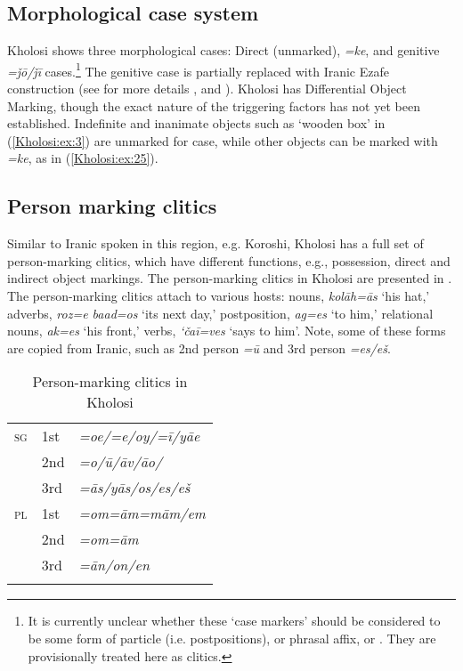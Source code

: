 \documentclass[output=paper,colorlinks,citecolor=brown]{langscibook}
\begin{document}
\subsection{Morphological case system}\label{Kholosi:ss:2.2}

Kholosi shows three morphological cases: Direct (unmarked),  \textit{=ke}, and genitive \textit{=ǰō/ǰī} cases.\footnote{ It is currently unclear whether these `case markers' should be considered to be some form of particle (i.e. postpositions), or phrasal affix, or . They are provisionally treated here as clitics.} The genitive case is partially replaced with Iranic Ezafe construction (see for more details \citealt{nourzaei_forthcoming_kholosi}, and \citealt{nourzaei_forthcoming_morphosyntax}). Kholosi has Differential Object Marking, though the exact nature of the triggering factors has not yet been established. Indefinite and inanimate objects such as `wooden box' in (\ref{Kholosi:ex:3}) are unmarked for case, while other objects can be marked with \textit{=ke}, as in (\ref{Kholosi:ex:25}).

\subsection{Person marking clitics}\label{Kholosi:ss:2.3}

\begin{sloppypar}
Similar to Iranic spoken in this region, e.g. Koroshi, Kholosi has a full set of person-marking clitics, which have different functions, e.g., possession, direct and indirect object markings. The person-marking clitics in Kholosi are presented in . The person-marking clitics attach to various hosts: nouns, \textit{kolāh=ās} `his hat,' adverbs, \textit{roz=e baad=os} `its next day,' postposition, \textit{ag=es} `to him,' relational nouns, \textit{ak=es} `his front,' verbs, \textit{ `čaī=ves} `says to him'. Note, some of these forms are copied from Iranic, such as 2nd person \textit{=ū} and 3rd person \textit{=es/eš}.
\end{sloppypar}

\begin{table}
 \centering
 \begin{tabular}{lll}
\lsptoprule
\textsc{sg} & 1st & \textit{=oe/=e/oy/=ī/yāe} \\
 & 2nd & \textit{=o/ū/āv/āo/} \\
 & 3rd & \textit{=ās/yās/os/es/eš} \\
\textsc{pl} & 1st & \textit{=om=ām=mām/em} \\
 & 2nd & \textit{=om=ām} \\
 & 3rd & \textit{=ān/on/en} \\
\lspbottomrule
 \end{tabular}
 \caption{Person-marking clitics in Kholosi}
 \label{Kholosi:tab:1}
\end{table}
\end{document}
